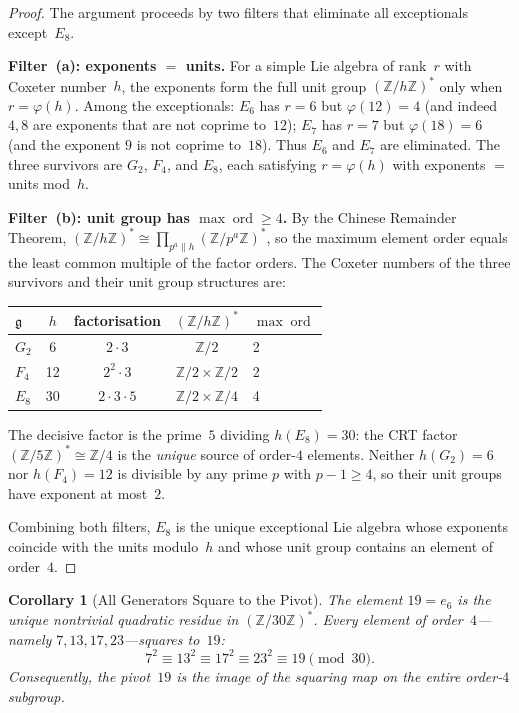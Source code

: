 \documentclass[11pt]{amsart}
\theoremstyle{plain}
\newtheorem{corollary}[theorem]{Corollary}
\theoremstyle{definition}
\theoremstyle{remark}
\newcommand{\fg}{\mathfrak{g}}
\begin{document}
\begin{proof}
The argument proceeds by two filters that eliminate all exceptionals
except~$E_8$.

\smallskip\noindent\textbf{Filter~(a): exponents $=$ units.}
For a simple Lie algebra of rank~$r$ with Coxeter number~$h$,
the exponents form the full unit group $(\mathbb{Z}/h\mathbb{Z})^*$
only when $r = \varphi(h)$.  Among the exceptionals:
$E_6$ has $r = 6$ but $\varphi(12) = 4$ (and indeed $4, 8$ are
exponents that are not coprime to~$12$);
$E_7$ has $r = 7$ but $\varphi(18) = 6$ (and the exponent $9$
is not coprime to~$18$).
Thus $E_6$ and $E_7$ are eliminated.
The three survivors are $G_2$, $F_4$, and $E_8$, each satisfying
$r = \varphi(h)$ with exponents $=$ units mod~$h$.

\smallskip\noindent\textbf{Filter~(b): unit group has
$\max\operatorname{ord} \ge 4$.}
By the Chinese Remainder Theorem,
$(\mathbb{Z}/h\mathbb{Z})^* \cong \prod_{p^a \| h}
(\mathbb{Z}/p^a\mathbb{Z})^*$,
so the maximum element order equals the least common multiple of the
factor orders.  The Coxeter numbers of the three survivors and
their unit group structures are:
\begin{center}
\begin{tabular}{@{}lcccl@{}}
\toprule
$\fg$ & $h$ & factorisation & $(\mathbb{Z}/h\mathbb{Z})^*$ & $\max\operatorname{ord}$ \\
\midrule
$G_2$  & 6  & $2 \cdot 3$ & $\mathbb{Z}/2$ & 2 \\
$F_4$  & 12 & $2^2 \cdot 3$ & $\mathbb{Z}/2 \times \mathbb{Z}/2$ & 2 \\
$E_8$  & 30 & $2 \cdot 3 \cdot 5$ & $\mathbb{Z}/2 \times \mathbb{Z}/4$ & 4 \\
\bottomrule
\end{tabular}
\end{center}
The decisive factor is the prime~$5$ dividing $h(E_8) = 30$:
the CRT factor $(\mathbb{Z}/5\mathbb{Z})^*\cong\mathbb{Z}/4$
is the \emph{unique} source of order-$4$ elements.
Neither $h(G_2) = 6$ nor $h(F_4) = 12$ is divisible by any
prime $p$ with $p - 1 \ge 4$, so their unit groups have
exponent at most~$2$.

Combining both filters, $E_8$ is the unique exceptional Lie algebra
whose exponents coincide with the units modulo~$h$ and whose unit
group contains an element of order~$4$.
\end{proof}

\begin{corollary}[All Generators Square to the Pivot]\label{cor:QR-pivot}
The element $19 = e_6$ is the unique nontrivial quadratic residue in
$(\mathbb{Z}/30\mathbb{Z})^*$.  Every element of order~$4$---namely
$7, 13, 17, 23$---squares to~$19$:
\[
  7^2 \equiv 13^2 \equiv 17^2 \equiv 23^2 \equiv 19 \pmod{30}.
\]
Consequently, the pivot~$19$ is the image of the squaring map on the
entire order-$4$ subgroup.
\end{corollary}
\end{document}
